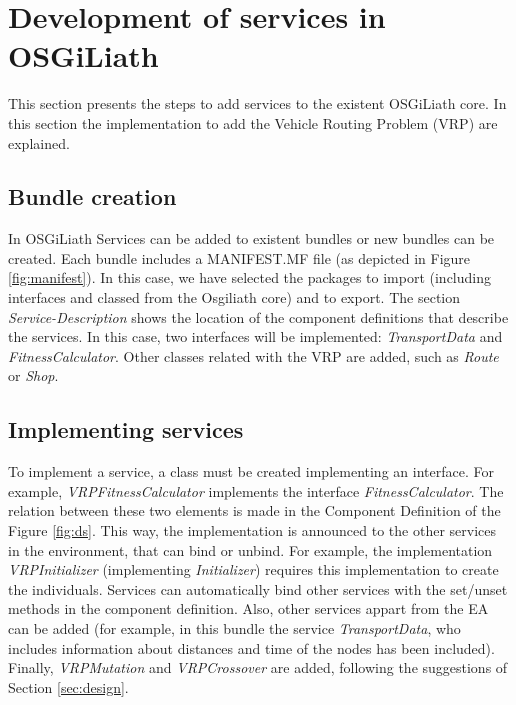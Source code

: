 \documentclass{sig-alternate}
\begin{document}
\section{Development of services in OSGiLiath}
\label{sec:development}
This section presents the steps to add services to the existent OSGiLiath core. In this section the implementation to add the Vehicle Routing Problem (VRP) are explained.

\subsection{Bundle creation}

In OSGiLiath Services can be added to existent bundles or new bundles can be created. Each bundle includes a MANIFEST.MF file (as depicted in Figure \ref{fig:manifest}). In this case, we have selected the packages to import (including interfaces and classed from the Osgiliath core) and to export. The section {\em Service-Description} shows the location of the component definitions that describe the services. In this case, two interfaces will be implemented: {\em TransportData} and {\em FitnessCalculator}. Other classes related with the VRP are added, such as {\em Route} or {\em Shop}.

\subsection{Implementing services}
To implement a service, a class must be created implementing an interface. For example, {\em VRPFitnessCalculator} implements the interface {\em FitnessCalculator}. The relation between these two elements is made in the Component Definition of the Figure \ref{fig:ds}. This way, the implementation is announced to the other services in the environment, that can bind or unbind. For example, the implementation {\em VRPInitializer} (implementing {\em Initializer}) requires this implementation to create the individuals. Services can automatically bind other services with the set/unset methods in the component definition. Also, other services appart from the EA can be added (for example, in this bundle the service {\em TransportData}, who includes information about distances and time of the nodes has been included). Finally, {\em VRPMutation} and {\em VRPCrossover} are added, following the suggestions of Section \ref{sec:design}.
\end{document}
